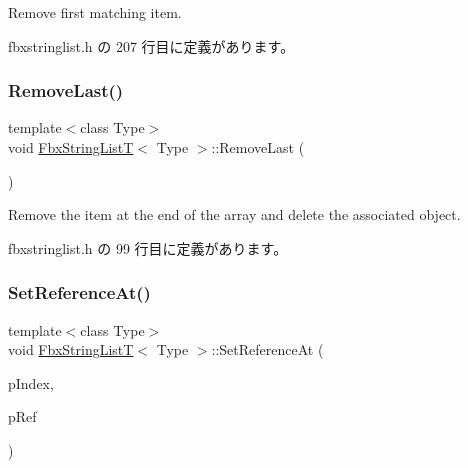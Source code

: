 Remove first matching item. 



 fbxstringlist.\+h の 207 行目に定義があります。

\mbox{\label{class_fbx_string_list_t_aa4a95c08fe634e37cf9ccc41b28a9d11}} 
\subsubsection{\texorpdfstring{Remove\+Last()}{RemoveLast()}}
{\footnotesize\ttfamily template$<$class Type$>$ \\
void \hyperlink{class_fbx_string_list_t}{Fbx\+String\+ListT}$<$ Type $>$\+::Remove\+Last (\begin{DoxyParamCaption}{ }\end{DoxyParamCaption})\hspace{0.3cm}{\ttfamily [inline]}}



Remove the item at the end of the array and delete the associated object. 



 fbxstringlist.\+h の 99 行目に定義があります。

\mbox{\label{class_fbx_string_list_t_a8ad989bfb74117a2bd948538ae1437ba}} 
\subsubsection{\texorpdfstring{Set\+Reference\+At()}{SetReferenceAt()}}
{\footnotesize\ttfamily template$<$class Type$>$ \\
void \hyperlink{class_fbx_string_list_t}{Fbx\+String\+ListT}$<$ Type $>$\+::Set\+Reference\+At (\begin{DoxyParamCaption}\item[{int}]{p\+Index,  }\item[{Fbx\+Handle}]{p\+Ref }\end{DoxyParamCaption})\hspace{0.3cm}{\ttfamily [inline]}}




